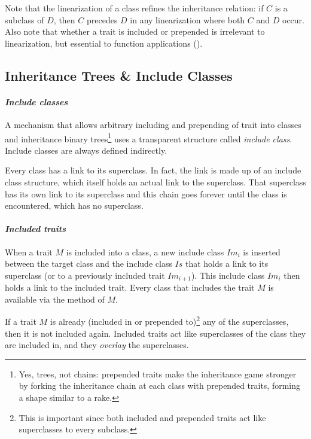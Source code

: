 Note that the linearization of a class refines the inheritance relation: if $C$ is a subclass of $D$, then $C$ precedes $D$ in any linearization where both $C$ and $D$ occur. Also note that whether a trait is included or prepended is irrelevant to linearization, but essential to function applications ().





\subsection{Inheritance Trees \& Include Classes}
\label{sec:inheritance-trees}
\label{sec:include-classes}

\paragraph{\em Include classes}
A mechanism that allows arbitrary including and prepending of trait into classes and inheritance binary trees\footnote{Yes, trees, not chains: prepended traits make the inheritance game stronger by forking the inheritance chain at each class with prepended traits, forming a shape similar to a rake.} uses a transparent structure called {\em include class}. Include classes are always defined indirectly.

Every class has a link to its superclass. In fact, the link is made up of an include class structure, which itself holds an actual link to the superclass. That superclass has its own link to its superclass and this chain goes forever until the  class is encountered, which has no superclass. 

\paragraph{\em Included traits}
When a trait $M$ is included into a class, a new include class $Im_i$ is inserted between the target class and the include class $Is$ that holds a link to its superclass (or to a previously included trait $Im_{i+1}$). This include class $Im_i$ then holds a link to the included trait. Every class that includes the trait $M$ is available via the  method of $M$. 

If a trait $M$ is already (included in or prepended to)\footnote{This is important since both included and prepended traits act like superclasses to every subclass.} any of the superclasses, then it is not included again. Included traits act like superclasses of the class they are included in, and they {\em overlay} the superclasses. 

